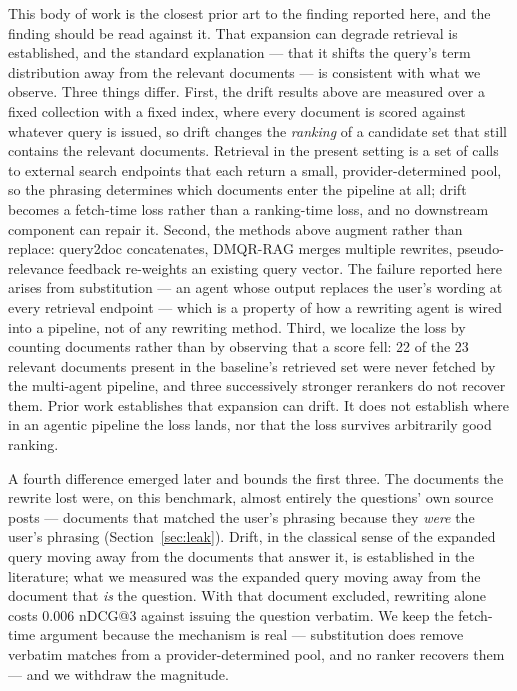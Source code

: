\documentclass[acmsmall,review,anonymous,screen]{acmart}
\begin{document}
This body of work is the closest prior art to the finding reported here, and the
finding should be read against it. That expansion can degrade retrieval is
established, and the standard explanation --- that it shifts the query's term
distribution away from the relevant documents --- is consistent with what we
observe. Three things differ. First, the drift results above are measured over a
fixed collection with a fixed index, where every document is scored against
whatever query is issued, so drift changes the \emph{ranking} of a candidate set
that still contains the relevant documents. Retrieval in the present setting is a
set of calls to external search endpoints that each return a small,
provider-determined pool, so the phrasing determines which documents enter the
pipeline at all; drift becomes a fetch-time loss rather than a ranking-time loss,
and no downstream component can repair it. Second, the methods above augment
rather than replace: query2doc concatenates, DMQR-RAG merges multiple rewrites,
pseudo-relevance feedback re-weights an existing query vector. The failure
reported here arises from substitution --- an agent whose output replaces the
user's wording at every retrieval endpoint --- which is a property of how a
rewriting agent is wired into a pipeline, not of any rewriting method. Third, we
localize the loss by counting documents rather than by observing that a score
fell: 22 of the 23 relevant documents present in the baseline's retrieved set
were never fetched by the multi-agent pipeline, and three successively stronger
rerankers do not recover them. Prior work establishes that expansion can drift.
It does not establish where in an agentic pipeline the loss lands, nor that the
loss survives arbitrarily good ranking.

A fourth difference emerged later and bounds the first three. The documents the
rewrite lost were, on this benchmark, almost entirely the questions' own source
posts --- documents that matched the user's phrasing because they \emph{were}
the user's phrasing (Section~\ref{sec:leak}). Drift, in the classical sense of
the expanded query moving away from the documents that answer it, is
established in the literature; what we measured was the expanded query moving
away from the document that \emph{is} the question. With that document
excluded, rewriting alone costs 0.006 nDCG@3 against issuing the question
verbatim. We keep the fetch-time argument because the mechanism is real ---
substitution does remove verbatim matches from a provider-determined pool, and
no ranker recovers them --- and we withdraw the magnitude.
\end{document}
